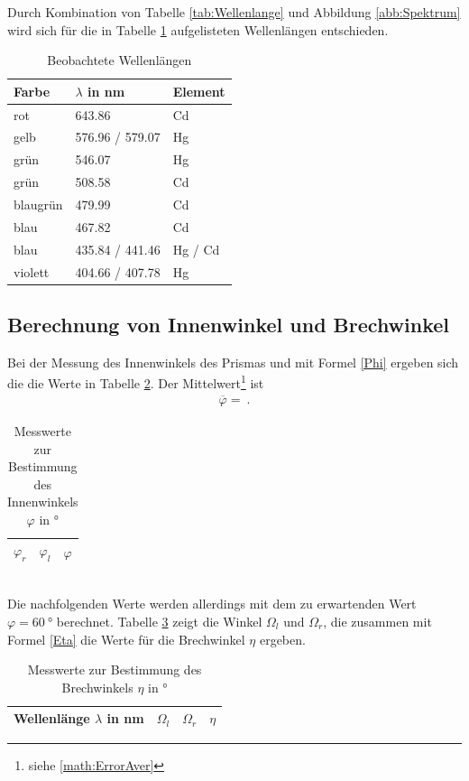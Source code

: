 Durch Kombination von Tabelle \ref{tab:Wellenlange} und Abbildung \ref{abb:Spektrum} wird sich für die in Tabelle \ref{tab:Wellen} aufgelisteten Wellenlängen entschieden.
\begin{table}[h!]
\centering
\begin{tabular}{lll}
	Farbe & $\lambda$ in \si{\nano\meter} & Element \\
	\hline
	rot & 643.86 & Cd \\
	gelb & 576.96 / 579.07 & Hg \\
	grün & 546.07 & Hg \\
	grün & 508.58 & Cd \\
	blaugrün & 479.99 & Cd \\
	blau & 467.82 & Cd \\
	blau & 435.84 / 441.46 & Hg / Cd \\
	violett & 404.66 / 407.78 & Hg
\end{tabular}
\caption{Beobachtete Wellenlängen}
\label{tab:Wellen}
\end{table}
\clearpage


\subsection{Berechnung von Innenwinkel und Brechwinkel}
Bei der Messung des Innenwinkels des Prismas und mit Formel \eqref{Phi} ergeben sich die die Werte in Tabelle \ref{tab:WinkelPhi}. Der Mittelwert\footnote{siehe \ref{math:ErrorAver}} ist
\begin{align}
	\overline{\varphi} =  \ .
\end{align}
\begin{table}[h!]
	\centering	
	\begin{tabular}{c|c|c}
		$\varphi_r$ & $\varphi_l$ & $\varphi$ \\
		\hline
		
	\end{tabular}
	\caption{Messwerte zur Bestimmung des Innenwinkels $\varphi$ in \si{\degree}}
	\label{tab:WinkelPhi}
\end{table} \\
Die nachfolgenden Werte werden allerdings mit dem zu erwartenden Wert $\varphi= \SI{60}{\degree}$ berechnet.
Tabelle \ref{tab:WinkelFarben} zeigt die Winkel $\Omega_l$ und $\Omega_r$, die zusammen mit Formel \eqref{Eta} die Werte für die Brechwinkel $\eta$ ergeben.
\begin{table}[h!]
	\centering	
	\begin{tabular}{c|c|c|c}
		Wellenlänge $\lambda$ in \si{\nano\meter} & $\Omega_l$ & $\Omega_r$ & $\eta$ \\
		\hline
		
	\end{tabular}
	\caption{Messwerte zur Bestimmung des Brechwinkels $\eta$ in \si{\degree}}
	\label{tab:WinkelFarben}
\end{table}
\clearpage


